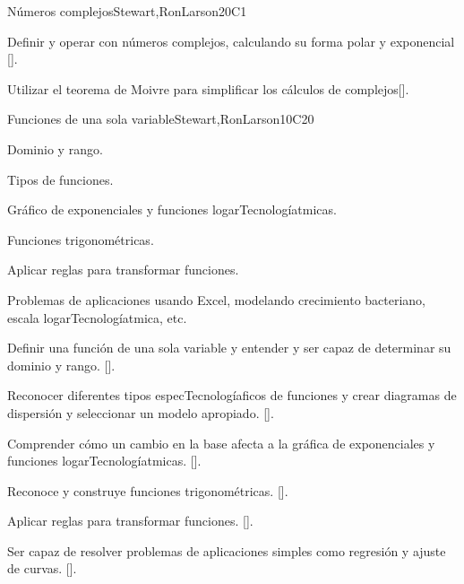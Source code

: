 \begin{syllabus}
\begin{unit}{Números complejos}{}{Stewart,RonLarson}{20}{C1}
   \begin{learningoutcomes}
      \item  Definir y operar con números complejos, calculando su forma polar y exponencial [\Assessment].
      \item  Utilizar el teorema de Moivre para simplificar los cálculos de complejos[\Assessment].
      \end{learningoutcomes}
\end{unit}

\begin{unit}{Funciones de una sola variable}{}{Stewart,RonLarson}{10}{C20}

  
  \begin{topics}
    \item Dominio y rango.
    \item Tipos de funciones.
    \item Gráfico de exponenciales y funciones logarTecnologíatmicas.
    \item Funciones trigonométricas.
    \item Aplicar reglas para transformar funciones.
    \item  Problemas de aplicaciones usando Excel, modelando crecimiento bacteriano, escala logarTecnologíatmica, etc.
   \end{topics}

   \begin{learningoutcomes}
      \item Definir una función de una sola variable y entender y ser capaz de determinar su dominio y rango. [\Assessment].
      \item Reconocer diferentes tipos especTecnologíaficos de funciones y crear diagramas de dispersión y seleccionar un modelo apropiado. [\Assessment].
      \item Comprender cómo un cambio en la base afecta a la gráfica de exponenciales y funciones logarTecnologíatmicas. [\Assessment].
      \item Reconoce y construye funciones trigonométricas. [\Assessment].
      \item Aplicar reglas para transformar funciones. [\Assessment].
      \item Ser capaz de resolver problemas de aplicaciones simples como regresión y ajuste de curvas. [\Assessment].
    \end{learningoutcomes}
\end{unit}


\end{syllabus}
